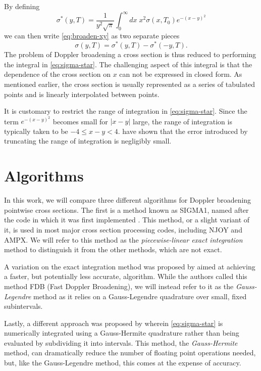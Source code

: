 \documentclass[3p,authoryear]{elsarticle}
\begin{document}
By defining
\begin{equation}
  \label{eq:sigma-star}
  \sigma^* (y,T) = \frac{1}{y^2\sqrt{\pi}} \int_0^{\infty} dx \; x^2
  \sigma(x,T_0) e^{-(x - y)^2}
\end{equation}
we can then write \autoref{eq:broaden-xy} as two separate pieces
\begin{equation}
  \sigma(y,T) = \sigma^*(y,T) - \sigma^*(-y,T).
\end{equation}
The problem of Doppler broadening a cross section is thus reduced to performing
the integral in \autoref{eq:sigma-star}. The challenging aspect of this integral
is that the dependence of the cross section on $x$ can not be expressed in
closed form. As mentioned earlier, the cross section is usually represented as a
series of tabulated points and is linearly interpolated between points.

It is customary to restrict the range of integration in
\autoref{eq:sigma-star}. Since the term $e^{-(x-y)^2}$ becomes small for $|x-y|$
large, the range of integration is typically taken to be $-4 \le x - y <
4$. \citet{nse-cullen-1976} have shown that the error introduced by truncating
the range of integration is negligibly small.

\section{Algorithms}

In this work, we will compare three different algorithms for Doppler broadening
pointwise cross sections. The first is a method known as SIGMA1, named after the
code in which it was first implemented \citep{nse-cullen-1976}. This method, or
a slight variant of it, is used in most major cross section processing codes,
including NJOY and AMPX. We will refer to this method as the
\textit{piecewise-linear exact integration} method to distinguish it from the
other methods, which are not exact.

A variation on the exact integration method was proposed by
\citet{physor-li-2012} aimed at achieving a faster, but potentially less
accurate, algorithm. While the authors called this method FDB (Fast Doppler
Broadening), we will instead refer to it as the \textit{Gauss-Legendre} method
as it relies on a Gauss-Legendre quadrature over small, fixed subintervals.

Lastly, a different approach was proposed by \citet{nd-dean-2010} wherein
\autoref{eq:sigma-star} is numerically integrated using a Gauss-Hermite
quadrature rather than being evaluated by subdividing it into intervals. This
method, the \textit{Gauss-Hermite} method, can dramatically reduce the number of
floating point operations needed, but, like the Gauss-Legendre method, this
comes at the expense of accuracy.
\end{document}
